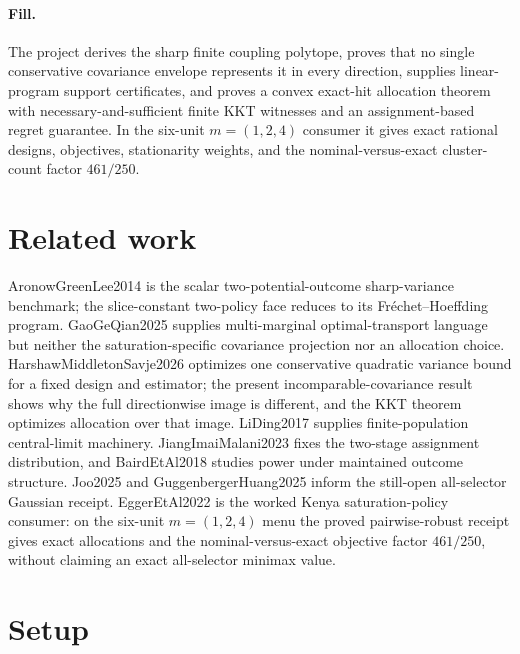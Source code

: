 \documentclass{article}
\begin{document}
\paragraph{Fill.} The project derives the sharp finite coupling polytope, proves that no single conservative covariance envelope represents it in every direction, supplies linear-program support certificates, and proves a convex exact-hit allocation theorem with necessary-and-sufficient finite KKT witnesses and an assignment-based regret guarantee. In the six-unit \(m=(1,2,4)\) consumer it gives exact rational designs, objectives, stationarity weights, and the nominal-versus-exact cluster-count factor \(461/250\).

\section{Related work}

AronowGreenLee2014 is the scalar two-potential-outcome sharp-variance benchmark; the slice-constant two-policy face reduces to its Fréchet--Hoeffding program. GaoGeQian2025 supplies multi-marginal optimal-transport language but neither the saturation-specific covariance projection nor an allocation choice. HarshawMiddletonSavje2026 optimizes one conservative quadratic variance bound for a fixed design and estimator; the present incomparable-covariance result shows why the full directionwise image is different, and the KKT theorem optimizes allocation over that image. LiDing2017 supplies finite-population central-limit machinery. JiangImaiMalani2023 fixes the two-stage assignment distribution, and BairdEtAl2018 studies power under maintained outcome structure. Joo2025 and GuggenbergerHuang2025 inform the still-open all-selector Gaussian receipt. EggerEtAl2022 is the worked Kenya saturation-policy consumer: on the six-unit \(m=(1,2,4)\) menu the proved pairwise-robust receipt gives exact allocations and the nominal-versus-exact objective factor \(461/250\), without claiming an exact all-selector minimax value.

\section{Setup}
\end{document}
